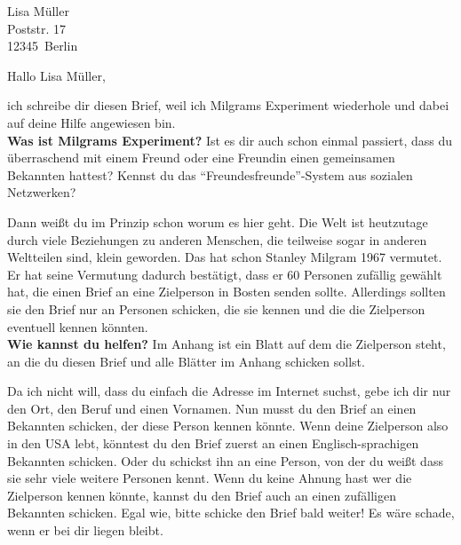 \documentclass[a4paper, 12pt, KOMAold, sections]{scrlttr2}
\newcommand{\Empfaenger}{Lisa Müller} %
\newcommand{\EStrasse}{Poststr. 17}   %
\newcommand{\EPLZ}{12345}             %
\newcommand{\EOrt}{Berlin}            %
\newcommand{\DocTitle}{Milgrams Small World Experiment} %
\newcommand{\section}[1]{\noindent\textbf{#1}\newline}
\begin{document}
    \begin{letter}{\Empfaenger \\ \EStrasse \\ \EPLZ~\EOrt}
    \date{\today}%
    \subject{\DocTitle}
    \opening{Hallo \Empfaenger,}
    ich schreibe dir diesen Brief, weil ich Milgrams Experiment wiederhole und
    dabei auf deine Hilfe angewiesen bin.\\

    \section{Was ist Milgrams Experiment?}
    Ist es dir auch schon einmal passiert, dass du überraschend mit einem Freund 
    oder eine Freundin einen gemeinsamen Bekannten hattest? Kennst du
    das "`Freundesfreunde"'-System aus sozialen Netzwerken?

    Dann weißt du im Prinzip schon worum es hier geht. Die Welt ist heutzutage
    durch viele Beziehungen zu anderen Menschen, die teilweise sogar in anderen
    Weltteilen sind, klein geworden. Das hat schon Stanley Milgram 1967 vermutet.
    Er hat seine Vermutung dadurch bestätigt, dass er 60 Personen zufällig
    gewählt hat, die einen Brief an eine Zielperson in Bosten senden sollte.
    Allerdings sollten sie den Brief nur an Personen schicken, die sie kennen
    und die die Zielperson eventuell kennen könnten.\\

    \section{Wie kannst du helfen?}
    Im Anhang ist ein Blatt auf dem die Zielperson steht, an die du diesen Brief
    und alle Blätter im Anhang schicken sollst. 

    Da ich nicht will, dass du einfach die Adresse im Internet
    suchst, gebe ich dir nur den Ort, den Beruf und einen Vornamen. Nun musst 
    du den Brief an einen Bekannten schicken, der diese Person kennen könnte.
    Wenn deine Zielperson also in den USA lebt, könntest du den Brief zuerst
    an einen Englisch-sprachigen Bekannten schicken. Oder du schickst ihn an
    eine Person, von der du weißt dass sie sehr viele weitere Personen kennt.
    Wenn du keine Ahnung hast wer die Zielperson kennen könnte, kannst du den
    Brief auch an einen zufälligen Bekannten schicken. Egal wie, bitte schicke
    den Brief bald weiter! Es wäre schade, wenn er bei dir liegen bleibt.\\


\end{letter}
\end{document}
